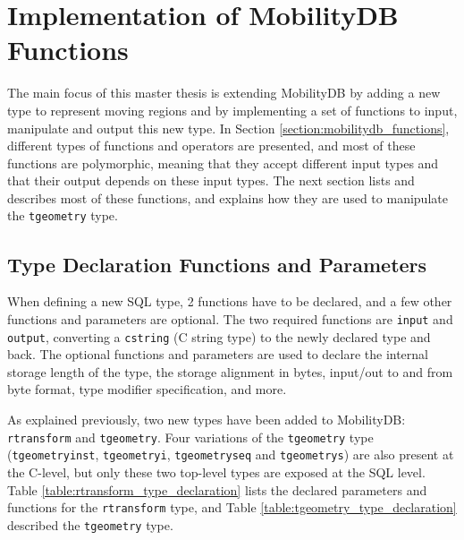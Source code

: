 
\section{Implementation of MobilityDB Functions}
\label{section:general_functions}

The main focus of this master thesis is extending MobilityDB by adding a new type to represent moving regions and by implementing a set of functions to input, manipulate and output this new type. In Section \ref{section:mobilitydb_functions}, different types of functions and operators are presented, and most of these functions are polymorphic, meaning that they accept different input types and that their output depends on these input types. The next section lists and describes most of these functions, and explains how they are used to manipulate the \lstinline+tgeometry+ type.

\subsection{Type Declaration Functions and Parameters}
\label{section:type_declaration}

When defining a new SQL type, 2 functions have to be declared, and a few other functions and parameters are optional. The two required functions are \lstinline{input} and \lstinline{output}, converting a \lstinline{cstring} (C string type) to the newly declared type and back. The optional functions and parameters are used to declare the internal storage length of the type, the storage alignment in bytes, input/out to and from byte format, type modifier specification, and more.

As explained previously, two new types have been added to MobilityDB: \lstinline{rtransform} and \lstinline{tgeometry}. Four variations of the \lstinline+tgeometry+ type (\lstinline{tgeometryinst}, \lstinline{tgeometryi}, \lstinline{tgeometryseq} and \lstinline{tgeometrys}) are also present at the C-level, but only these two top-level types are exposed at the SQL level. Table \ref{table:rtransform_type_declaration} lists the declared parameters and functions for the \lstinline+rtransform+ type, and Table \ref{table:tgeometry_type_declaration} described the \lstinline+tgeometry+ type.

